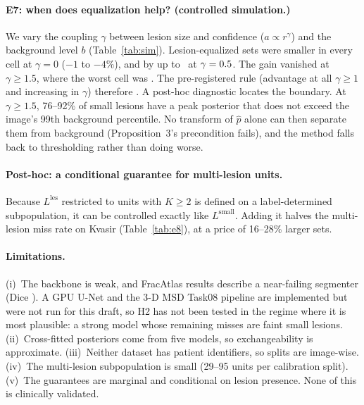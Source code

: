 \paragraph{E7: when does equalization help? (controlled simulation.)}
We vary the coupling $\gamma$ between lesion size and confidence
($a\propto r^\gamma$) and the background level $b$ (Table~\ref{tab:sim}).
Lesion-equalized sets were smaller in every cell at $\gamma=0$ ($-1$ to $-4\%$),
and by up to \SimBest\ at $\gamma=0.5$. The gain vanished at
$\gamma\ge1.5$, where the worst cell was \SimWorst. The pre-registered rule
(advantage at all $\gamma\ge1$ and increasing in $\gamma$) therefore
\SimVerdict. A post-hoc diagnostic locates the boundary. At $\gamma\ge1.5$,
76--92\% of small lesions have a peak posterior that does not exceed the image's
99th background percentile. No transform of $\hat p$ alone can then separate
them from background (Proposition~3's precondition fails), and the method falls
back to thresholding rather than doing worse.

\begin{table}[t]\centering\scriptsize
\caption{E7: change in set size (\%) of lesion-equalized vs joint thresholding,
500 splits per cell. Bold: smaller in $\ge95\%$ of splits.}\label{tab:sim}

\end{table}

\paragraph{Post-hoc: a conditional guarantee for multi-lesion units.}\label{sec:posthoc}
Because $L^{\mathrm{les}}$ restricted to units with $K\ge2$ is defined on a
label-determined subpopulation, it can be controlled exactly like
$L^{\mathrm{small}}$. Adding it halves the multi-lesion miss rate on Kvasir
(Table~\ref{tab:e8}), at a price of 16--28\% larger sets.

\begin{table}[t]\centering\scriptsize
\caption{Post-hoc (not pre-registered): adding the conditional risk
$L^{\mathrm{les}}\mid K\ge2$ to the joint threshold.}\label{tab:e8}

\end{table}

\paragraph{Limitations.}
(i)~The backbone is weak, and FracAtlas results describe a near-failing
segmenter (Dice \FracatlasDice). A GPU U-Net and the 3-D MSD Task08 pipeline are
implemented but were not run for this draft, so H2 has not been tested in the
regime where it is most plausible: a strong model whose remaining misses are
faint small lesions.
(ii)~Cross-fitted posteriors come from five models, so exchangeability is
approximate.
(iii)~Neither dataset has patient identifiers, so splits are image-wise.
(iv)~The multi-lesion subpopulation is small (29--95 units per calibration split).
(v)~The guarantees are marginal and conditional on lesion presence. None of this
is clinically validated.


